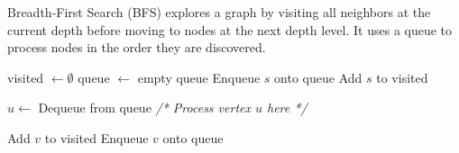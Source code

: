   \begin{algo}
    Breadth-First Search (BFS) explores a graph by visiting all neighbors at the current depth before moving to nodes at the next depth level. It uses a queue to process nodes in the order they are discovered.
    \begin{algorithm}[H]
      \label{alg:bfs}
      \begin{algorithmic}[1]
        
          \State visited $\gets \emptyset$ 
          \State queue $\gets$ empty queue
          \State Enqueue $s$ onto queue
          \State Add $s$ to visited
          
            \State $u \gets$ Dequeue from queue 
            \State \textit{/* Process vertex $u$ here */}
            
                \State Add $v$ to visited
                \State Enqueue $v$ onto queue
              \EndIf
            \EndFor
          \EndWhile
        \EndFunction
      \end{algorithmic}
    \end{algorithm}
  \end{algo}

